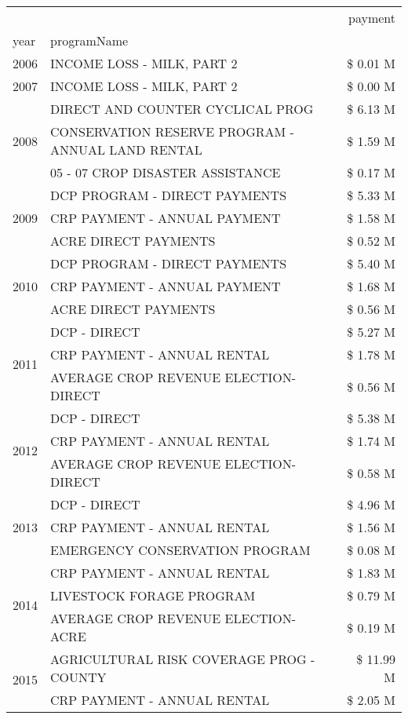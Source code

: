 \begin{tabular}{llr}
\toprule
 &  & payment \\
year & programName &  \\
\midrule
2006 & INCOME LOSS - MILK, PART 2 & \$ 0.01 M \\
\cline{1-3}
2007 & INCOME LOSS - MILK, PART 2 & \$ 0.00 M \\
\cline{1-3}
\multirow[t]{3}{*}{2008} & DIRECT AND COUNTER CYCLICAL PROG & \$ 6.13 M \\
 & CONSERVATION RESERVE PROGRAM - ANNUAL LAND RENTAL & \$ 1.59 M \\
 & 05 - 07 CROP DISASTER ASSISTANCE & \$ 0.17 M \\
\cline{1-3}
\multirow[t]{3}{*}{2009} & DCP PROGRAM - DIRECT PAYMENTS & \$ 5.33 M \\
 & CRP PAYMENT - ANNUAL PAYMENT & \$ 1.58 M \\
 & ACRE DIRECT PAYMENTS & \$ 0.52 M \\
\cline{1-3}
\multirow[t]{3}{*}{2010} & DCP PROGRAM - DIRECT PAYMENTS & \$ 5.40 M \\
 & CRP PAYMENT - ANNUAL PAYMENT & \$ 1.68 M \\
 & ACRE DIRECT PAYMENTS & \$ 0.56 M \\
\cline{1-3}
\multirow[t]{3}{*}{2011} & DCP - DIRECT & \$ 5.27 M \\
 & CRP PAYMENT - ANNUAL RENTAL & \$ 1.78 M \\
 & AVERAGE CROP REVENUE ELECTION-DIRECT & \$ 0.56 M \\
\cline{1-3}
\multirow[t]{3}{*}{2012} & DCP - DIRECT & \$ 5.38 M \\
 & CRP PAYMENT - ANNUAL RENTAL & \$ 1.74 M \\
 & AVERAGE CROP REVENUE ELECTION-DIRECT & \$ 0.58 M \\
\cline{1-3}
\multirow[t]{3}{*}{2013} & DCP - DIRECT & \$ 4.96 M \\
 & CRP PAYMENT - ANNUAL RENTAL & \$ 1.56 M \\
 & EMERGENCY CONSERVATION PROGRAM & \$ 0.08 M \\
\cline{1-3}
\multirow[t]{3}{*}{2014} & CRP PAYMENT - ANNUAL RENTAL & \$ 1.83 M \\
 & LIVESTOCK FORAGE PROGRAM & \$ 0.79 M \\
 & AVERAGE CROP REVENUE ELECTION-ACRE & \$ 0.19 M \\
\cline{1-3}
\multirow[t]{3}{*}{2015} & AGRICULTURAL RISK COVERAGE PROG - COUNTY & \$ 11.99 M \\
 & CRP PAYMENT - ANNUAL RENTAL & \$ 2.05 M \\

\end{tabular}
